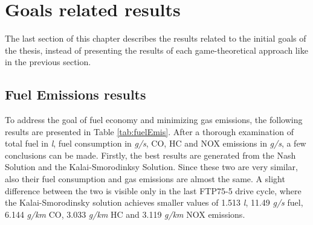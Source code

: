 \section{Goals related results}
The last section of this chapter describes the results related to the initial goals of the thesis, instead of presenting the results of each game-theoretical approach like in the previous section.

\subsection{Fuel Emissions results}
To address the goal of fuel economy and minimizing gas emissions, the following results are presented in Table \ref{tab:fuelEmis}. After a thorough examination of total fuel in \textit{l}, fuel consumption in \textit{g/s}, CO, HC and NOX emissions in \textit{g/s}, a few conclusions can be made. Firstly, the best results are generated from the Nash Solution and the Kalai-Smorodinksy Solution. Since these two are very similar, also their fuel consumption and gas emissions are almost the same. A slight difference between the two is visible only in the last FTP75-5 drive cycle, where the Kalai-Smorodinsky solution achieves smaller values of 1.513 \textit{l}, 11.49 \textit{g/s} fuel, 6.144 \textit{g/km} CO, 3.033 \textit{g/km} HC and 3.119 \textit{g/km} NOX emissions.

